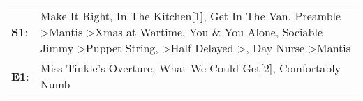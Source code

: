 \begin{supertabular}{p{0.03\textwidth}p{0.92\textwidth}}
 \textbf{S1}:  &  Make It Right\textsuperscript{}, \enspace In The Kitchen[1]\textsuperscript{}, \enspace Get In The Van\textsuperscript{}, \enspace Preamble\textsuperscript{} \textgreater \enspace Mantis\textsuperscript{} \textgreater \enspace Xmas at Wartime\textsuperscript{}, \enspace You \& You Alone\textsuperscript{}, \enspace Sociable Jimmy\textsuperscript{} \textgreater \enspace Puppet String\textsuperscript{}, \textsuperscript{} \textgreater \enspace Half Delayed\textsuperscript{} \textgreater {}\textsuperscript{}, \enspace Day Nurse\textsuperscript{} \textgreater \enspace Mantis\textsuperscript{}  \enspace  \\
 \textbf{E1}:  &                                                                                                                                                                                                                                                                                                                                                                                                                                                                                                      Miss Tinkle's Overture\textsuperscript{}, \enspace What We Could Get[2]\textsuperscript{}, \enspace Comfortably Numb\textsuperscript{}  \enspace  \\
\end{supertabular}
